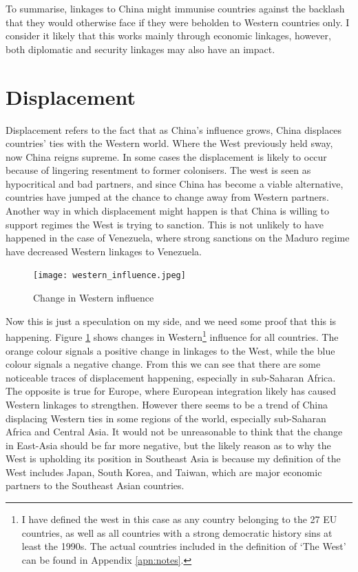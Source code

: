 To summarise, linkages to China might immunise countries against the backlash that they would otherwise face if they were beholden to Western countries only. I consider it likely that this works mainly through economic linkages, however, both diplomatic and security linkages may also have an impact.

\section{Displacement}
Displacement refers to the fact that as China's influence grows, China displaces countries' ties with the Western world. Where the West previously held sway, now China reigns supreme. In some cases the displacement is likely to occur because of lingering resentment to former colonisers. The west is seen as hypocritical and bad partners, and since China has become a viable alternative, countries have jumped at the chance to change away from Western partners. Another way in which displacement might happen is that China is willing to support regimes the West is trying to sanction. This is not unlikely to have happened in the case of Venezuela, where strong sanctions on the Maduro regime have decreased Western linkages to Venezuela.

\begin{figure}[hbt!]
\centering
\texttt{[image: western\_influence.jpeg]}
\caption{Change in Western influence}
\label{fig:west}
\end{figure}

Now this is just a speculation on my side, and we need some proof that this is happening. Figure  \ref{fig:west} shows changes in Western\footnote{I have defined the west in this case as any country belonging to the 27 EU countries, as well as all countries with a strong democratic history sins at least the 1990s. The actual countries included in the definition of `The West' can be found in Appendix \ref{apn:notes}.} influence for all countries. The orange colour signals a positive change in linkages to the West, while the blue colour signals a negative change. From this we can see that there are some noticeable traces of displacement happening, especially in sub-Saharan Africa. The opposite is true for Europe, where European integration likely has caused Western linkages to strengthen. However there seems to be a trend of China displacing Western ties in some regions of the world, especially sub-Saharan Africa and Central Asia. It would not be unreasonable to think that the change in East-Asia should be far more negative, but the likely reason as to why the West is upholding its position in Southeast Asia is because my definition of the West includes Japan, South Korea, and Taiwan, which are major economic partners to the Southeast Asian countries. 

